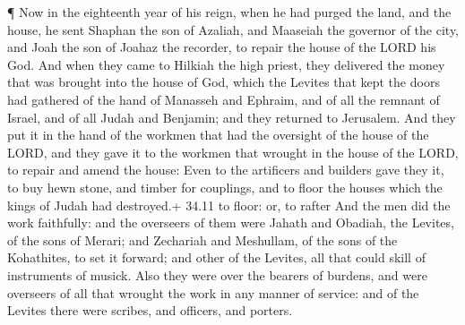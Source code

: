  ¶ Now in the eighteenth year of his reign, when he had
purged the land, and the house, he sent Shaphan the son of Azaliah, and
Maaseiah the governor of the city, and Joah the son of Joahaz the
recorder, to repair the house of the LORD his God.  And when
they came to Hilkiah the high priest, they delivered the money that was
brought into the house of God, which the Levites that kept the doors had
gathered of the hand of Manasseh and Ephraim, and of all the remnant of
Israel, and of all Judah and Benjamin; and they returned to Jerusalem.
 And they put it in the hand of the workmen that had the
oversight of the house of the LORD, and they gave it to the workmen that
wrought in the house of the LORD, to repair and amend the house:
 Even to the artificers and builders gave they it, to buy
hewn stone, and timber for couplings, and to floor the houses which the
kings of Judah had destroyed.+ 34.11 to floor: or, to rafter
 And the men did the work faithfully: and the overseers of
them were Jahath and Obadiah, the Levites, of the sons of Merari; and
Zechariah and Meshullam, of the sons of the Kohathites, to set it
forward; and other of the Levites, all that could skill of instruments
of musick.  Also they were over the bearers of burdens, and
were overseers of all that wrought the work in any manner of service:
and of the Levites there were scribes, and officers, and porters.


